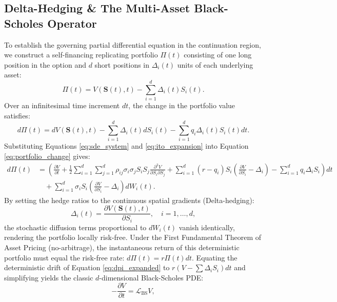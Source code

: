 \documentclass[11pt,a4paper]{article}
\begin{document}
\subsection{Delta-Hedging \& The Multi-Asset Black-Scholes Operator}
To establish the governing partial differential equation in the continuation region, we construct a self-financing replicating portfolio $\Pi(t)$ consisting of one long position in the option and $d$ short positions in $\Delta_i(t)$ units of each underlying asset:
\begin{equation}
\label{eq:hedging_portfolio}
\Pi(t) = V(\mathbf{S}(t), t) - \sum_{i=1}^d \Delta_i(t) S_i(t).
\end{equation}
Over an infinitesimal time increment $dt$, the change in the portfolio value satisfies:
\begin{equation}
\label{eq:portfolio_change}
d\Pi(t) = dV(\mathbf{S}(t), t) - \sum_{i=1}^d \Delta_i(t) dS_i(t) - \sum_{i=1}^d q_i \Delta_i(t) S_i(t) dt.
\end{equation}
Substituting Equations \eqref{eq:sde_system} and \eqref{eq:ito_expansion} into Equation \eqref{eq:portfolio_change} gives:
\begin{align}
\label{eq:dpi_expanded}
d\Pi(t) &= \left( \frac{\partial V}{\partial t} + \frac{1}{2}\sum_{i=1}^d \sum_{j=1}^d \rho_{ij} \sigma_i \sigma_j S_i S_j \frac{\partial^2 V}{\partial S_i \partial S_j} + \sum_{i=1}^d (r - q_i) S_i \left(\frac{\partial V}{\partial S_i} - \Delta_i\right) - \sum_{i=1}^d q_i \Delta_i S_i \right) dt \nonumber \\
&\quad + \sum_{i=1}^d \sigma_i S_i \left( \frac{\partial V}{\partial S_i} - \Delta_i \right) dW_i(t).
\end{align}
By setting the hedge ratios to the continuous spatial gradients (Delta-hedging):
\begin{equation}
\label{eq:delta_hedge_choice}
\Delta_i(t) = \frac{\partial V(\mathbf{S}(t), t)}{\partial S_i}, \quad i = 1, \dots, d,
\end{equation}
the stochastic diffusion terms proportional to $dW_i(t)$ vanish identically, rendering the portfolio locally risk-free. Under the First Fundamental Theorem of Asset Pricing (no-arbitrage), the instantaneous return of this deterministic portfolio must equal the risk-free rate: $d\Pi(t) = r \Pi(t) dt$. Equating the deterministic drift of Equation \eqref{eq:dpi_expanded} to $r\left(V - \sum \Delta_i S_i\right)dt$ and simplifying yields the classic $d$-dimensional Black-Scholes PDE:
\begin{equation}
\label{eq:multid_bs_pde}
-\frac{\partial V}{\partial t} = \mathcal{L}_{\text{BS}} V,
\end{equation}
\end{document}
